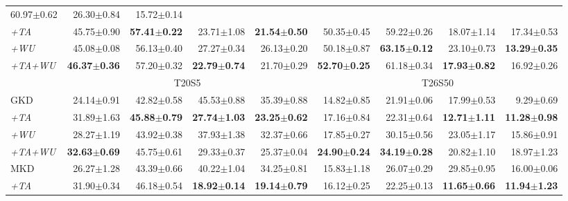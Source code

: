 \begin{appendix}
\begin{table*}[!th]
{\begin{tabular}{@{}lrrrrrrrr@{}}
  60.97$\pm$0.62 &
  26.30$\pm$0.84 &
  15.72$\pm$0.14 \\
\textit{+TA} &
  45.75$\pm$0.90 &
  \textbf{57.41$\pm$0.22} &
  23.71$\pm$1.08 &
  \textbf{21.54$\pm$0.50} &
  50.35$\pm$0.45 &
  59.22$\pm$0.26 &
  18.07$\pm$1.14 &
  17.34$\pm$0.53 \\
\textit{+WU} &
  45.08$\pm$0.08 &
  56.13$\pm$0.40 &
  27.27$\pm$0.34 &
  26.13$\pm$0.20 &
  50.18$\pm$0.87 &
  \textbf{63.15$\pm$0.12} &
  23.10$\pm$0.73 &
  \textbf{13.29$\pm$0.35} \\
\textit{+TA+WU} &
  \textbf{46.37$\pm$0.36} &
  57.20$\pm$0.32 &
  \textbf{22.79$\pm$0.74} &
  21.70$\pm$0.29 &
  \textbf{52.70$\pm$0.25} &
  61.18$\pm$0.34 &
  \textbf{17.93$\pm$0.82} &
  16.92$\pm$0.26 \\ \midrule 
 &
  \multicolumn{4}{c}{T20S5} &
  \multicolumn{4}{c}{T26S50} \\ 
  \midrule
GKD &
  24.14$\pm$0.91 &
  42.82$\pm$0.58 &
  45.53$\pm$0.88 &
  35.39$\pm$0.88 &
  14.82$\pm$0.85 &
  21.91$\pm$0.06 &
  17.99$\pm$0.53 &
  9.29$\pm$0.69 \\
\textit{+TA} &
  31.89$\pm$1.63 &
  \textbf{45.88$\pm$0.79} &
  \textbf{27.74$\pm$1.03} &
  \textbf{23.25$\pm$0.62} &
  17.16$\pm$0.84 &
  22.31$\pm$0.64 &
  \textbf{12.71$\pm$1.11} &
  \textbf{11.28$\pm$0.98} \\
\textit{+WU} &
  28.27$\pm$1.19 &
  43.92$\pm$0.38 &
  37.93$\pm$1.38 &
  32.37$\pm$0.66 &
  17.85$\pm$0.27 &
  30.15$\pm$0.56 &
  23.05$\pm$1.17 &
  15.86$\pm$0.91 \\
\textit{+TA+WU} &
  \textbf{32.63$\pm$0.69} &
  45.75$\pm$0.61 &
  29.33$\pm$0.37 &
  25.37$\pm$0.04 &
  \textbf{24.90$\pm$0.24} &
  \textbf{34.19$\pm$0.28} &
  20.82$\pm$1.10 &
  18.97$\pm$1.23 \\ \midrule
MKD &
  26.27$\pm$1.28 &
  43.39$\pm$0.66 &
  40.22$\pm$1.04 &
  34.25$\pm$0.81 &
  15.83$\pm$1.18 &
  26.07$\pm$0.29 &
  29.85$\pm$0.95 &
  16.00$\pm$0.06 \\
\textit{+TA} &
  31.90$\pm$0.34 &
  46.18$\pm$0.54 &
  \textbf{18.92$\pm$0.14} &
  \textbf{19.14$\pm$0.79} &
  16.12$\pm$0.25 &
  22.25$\pm$0.13 &
  \textbf{11.65$\pm$0.66} &
  \textbf{11.94$\pm$1.23} \\

\end{tabular}}
\end{table*}
\end{appendix}
